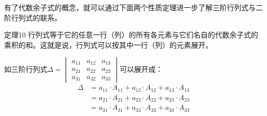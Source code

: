 有了代数余子式的概念，就可以通过下面两个性质定理进一步了解三阶行列式与二阶行列式的联系。

\begin{blk}{定理10}
    行列式等于它的任意一行（列）的所有各元素与它们名自的代数余子式的乘积的和。这就是说，行列式可以按其中一行（列）的元素展开。
    
    如三阶行列式$\Delta=\begin{vmatrix}
        a_{11}&a_{12}&a_{13}\\
        a_{21}&a_{22}&a_{23}\\
        a_{31}&a_{32}&a_{33}
    \end{vmatrix}$可以展开成：
\[\begin{split}
    \Delta &= a_{11}\cdot A_{11}+a_{12}\cdot A_{12}+a_{13}\cdot A_{13}\\
    &= a_{21}\cdot A_{21}+a_{22}\cdot A_{22}+a_{23}\cdot A_{23}\\
    &= a_{31}\cdot A_{31}
    +a_{32}\cdot A_{32}+a_{33}\cdot A_{33}
\end{split}\]
\end{blk}






\begin{example}
    
\end{example}



\begin{solution}
    
\end{solution}

\begin{example}
    
\end{example}

\begin{example}
    
\end{example}

\begin{solution}
    
\end{solution}

\begin{example}
    
\end{example}



\begin{solution}
    
\end{solution}

